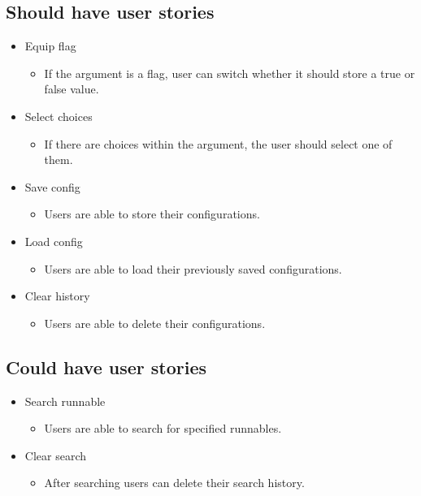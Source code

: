 \documentclass{article}
\begin{document}
\subsection{Should have user stories}
\begin{itemize}
    \item Equip flag
    \begin{itemize}
        \item If the argument is a flag, user can switch whether it should store a true or false value.
    \end{itemize}
    \item Select choices
    \begin{itemize}
        \item If there are choices within the argument, the user should select one of them.
    \end{itemize}
    \item Save config
     \begin{itemize}
         \item Users are able to store their configurations.
     \end{itemize}
     \item Load config
     \begin{itemize}
         \item Users are able to load their previously saved configurations.
     \end{itemize}
     \item Clear history
     \begin{itemize}
         \item Users are able to delete their configurations.
     \end{itemize}
\end{itemize}

\subsection{Could have user stories}
\begin{itemize}
    \item Search runnable
    \begin{itemize}
        \item Users are able to search for specified runnables.
    \end{itemize}
    \item Clear search
    \begin{itemize}
        \item After searching users can delete their search history.
    \end{itemize}
\end{itemize}
\end{document}
